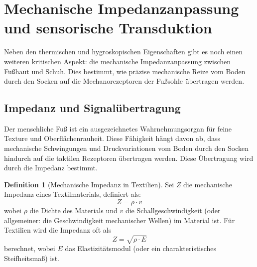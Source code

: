 \documentclass[a4paper,12pt]{article}
\theoremstyle{definition}
\newtheorem{definition}{Definition}
\begin{document}
\section{Mechanische Impedanzanpassung und sensorische Transduktion}

Neben den thermischen und hygroskopischen Eigenschaften gibt es noch einen weiteren kritischen Aspekt: die mechanische Impedanzanpassung zwischen Fußhaut und Schuh. Dies bestimmt, wie präzise mechanische Reize vom Boden durch den Socken auf die Mechanorezeptoren der Fußsohle übertragen werden.

\subsection{Impedanz und Signalübertragung}

Der menschliche Fuß ist ein ausgezeichnetes Wahrnehmungsorgan für feine Texture und Oberflächenrauheit. Diese Fähigkeit hängt davon ab, dass mechanische Schwingungen und Druckvariationen vom Boden durch den Socken hindurch auf die taktilen Rezeptoren übertragen werden. Diese Übertragung wird durch die Impedanz bestimmt.

\begin{definition}[Mechanische Impedanz in Textilien]
Sei $Z$ die mechanische Impedanz eines Textilmaterials, definiert als:
\[
Z = \rho \cdot v
\]
wobei $\rho$ die Dichte des Materials und $v$ die Schallgeschwindigkeit (oder allgemeiner: die Geschwindigkeit mechanischer Wellen) im Material ist. Für Textilien wird die Impedanz oft als
\[
Z = \sqrt{\rho \cdot E}
\]
berechnet, wobei $E$ das Elastizitätsmodul (oder ein charakteristisches Steifheitsmaß) ist.
\end{definition}
\end{document}
